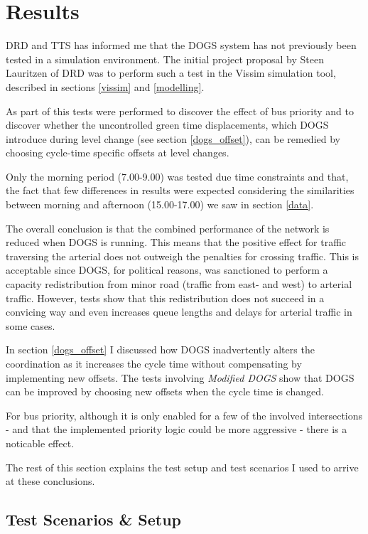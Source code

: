 \section{Results}
\label{test}
DRD and TTS has informed me that the DOGS system has not previously been tested in a simulation environment. The initial project proposal by Steen Lauritzen of DRD was to perform such a test in the Vissim simulation tool, described in sections \ref{vissim} and \ref{modelling}.

As part of this tests were performed to discover the effect of bus priority and to discover whether the uncontrolled green time displacements, which DOGS introduce during level change (see section \ref{dogs_offset}), can be remedied by choosing cycle-time specific offsets at level changes.

Only the morning period (7.00-9.00) was tested due time constraints and that, the fact that few differences in results were expected considering the similarities between morning and afternoon (15.00-17.00) we saw in section \ref{data}.
 
The overall conclusion is that the combined performance of the network is reduced when DOGS is running. This means that the positive effect for traffic traversing the arterial does not outweigh the penalties for crossing traffic. 
This is acceptable since DOGS, for political reasons, was sanctioned to perform a capacity redistribution from minor road (traffic from east- and west) to arterial traffic. However, tests show that this redistribution does not succeed in a convicing way and even increases queue lengths and delays for arterial traffic in some cases.

In section \ref{dogs_offset} I discussed how DOGS inadvertently alters the coordination as it increases the cycle time without compensating by implementing new offsets. The tests involving \textit{Modified DOGS} show that DOGS can be improved by choosing new offsets when the cycle time is changed.

For bus priority, although it is only enabled for a few of the involved intersections - and that the implemented priority logic could be more aggressive - there is a noticable effect.

The rest of this section explains the test setup and test scenarios I used to arrive at these conclusions. 

\subsection{Test Scenarios \& Setup}

